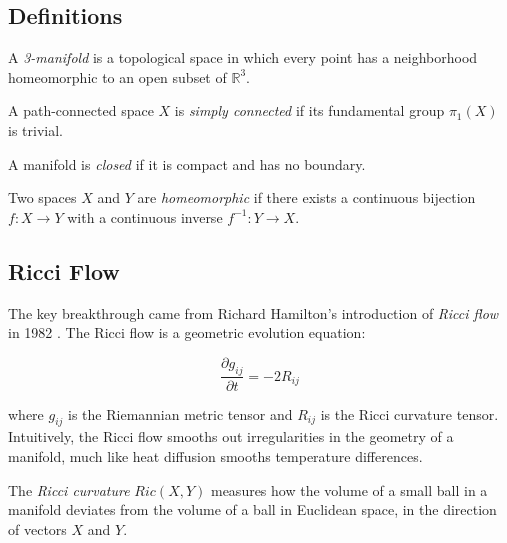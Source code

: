\subsection{Definitions}

\begin{definition}[3-Manifold]
A \emph{3-manifold} is a topological space in which every point has a neighborhood homeomorphic to an open subset of $\mathbb{R}^3$.
\end{definition}

\begin{definition}
A path-connected space $X$ is \emph{simply connected} if its fundamental group $\pi_1(X)$ is trivial.
\end{definition}

\begin{definition}
A manifold is \emph{closed} if it is compact and has no boundary.
\end{definition}

\begin{definition}[Homeomorphic]
Two spaces $X$ and $Y$ are \emph{homeomorphic} if there exists a continuous bijection $f: X \to Y$ with a continuous inverse $f^{-1}: Y \to X$.
\end{definition}

\subsection{Ricci Flow}

The key breakthrough came from Richard Hamilton's introduction of \emph{Ricci flow} in 1982 \cite{hamilton1982}. The Ricci flow is a geometric evolution equation:

\begin{equation}
\frac{\partial g_{ij}}{\partial t} = -2R_{ij}
\end{equation}

where $g_{ij}$ is the Riemannian metric tensor and $R_{ij}$ is the Ricci curvature tensor. Intuitively, the Ricci flow smooths out irregularities in the geometry of a manifold, much like heat diffusion smooths temperature differences.

\begin{definition}
The \emph{Ricci curvature} $Ric(X,Y)$ measures how the volume of a small ball in a manifold deviates from the volume of a ball in Euclidean space, in the direction of vectors $X$ and $Y$.
\end{definition}

